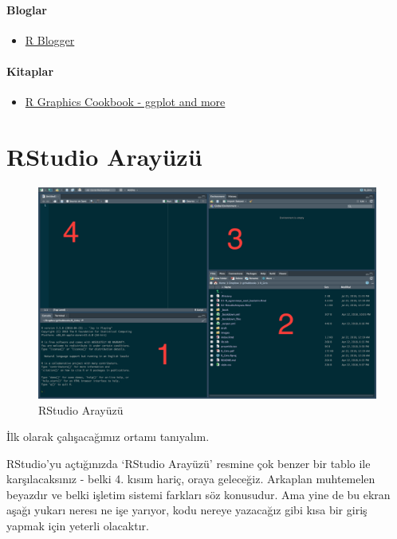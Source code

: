 \documentclass[]{book}
\providecommand{\tightlist}{%
  \setlength{\itemsep}{0pt}\setlength{\parskip}{0pt}}
\begin{document}
\hypertarget{bloglar}{%
\subsubsection{Bloglar}\label{bloglar}}

\begin{itemize}
\tightlist
\item
  \href{https://www.r-bloggers.com/}{R Blogger}
\end{itemize}

\hypertarget{kitaplar}{%
\subsubsection{Kitaplar}\label{kitaplar}}

\begin{itemize}
\tightlist
\item
  \href{http://www.cookbook-r.com/Graphs/}{R Graphics Cookbook - ggplot
  and more}
\end{itemize}

\hypertarget{rstudio}{%
\chapter{RStudio Arayüzü}\label{rstudio}}

\begin{figure}
\centering
\includegraphics{images/rstudio.png}
\caption{RStudio Arayüzü}
\end{figure}

İlk olarak çalışacağımız ortamı tanıyalım.

RStudio'yu açtığınızda `RStudio Arayüzü' resmine çok benzer bir tablo
ile karşılacaksınız - belki 4. kısım hariç, oraya geleceğiz. Arkaplan
muhtemelen beyazdır ve belki işletim sistemi farkları söz konusudur. Ama
yine de bu ekran aşağı yukarı neresı ne işe yarıyor, kodu nereye
yazacağız gibi kısa bir giriş yapmak için yeterli olacaktır.
\end{document}

